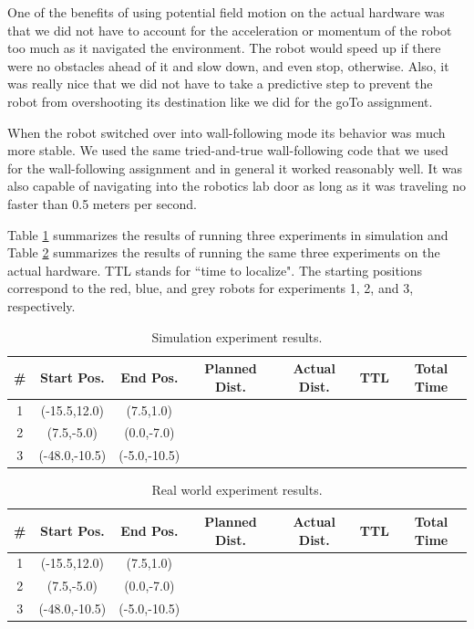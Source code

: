 \documentclass[12pt]{article}
\begin{document}
One of the benefits of using potential field motion on the actual hardware was that we did not have to account for the acceleration or momentum of the robot too much as it navigated the environment. The robot would speed up if there were no obstacles ahead of it and slow down, and even stop, otherwise. Also, it was really nice that we did not have to take a predictive step to prevent the robot from overshooting its destination like we did for the goTo assignment.

When the robot switched over into wall-following mode its behavior was much more stable. We used the same tried-and-true wall-following code that we used for the wall-following assignment and in general it worked reasonably well. It was also capable of navigating into the robotics lab door as long as it was traveling no faster than 0.5 meters per second.

Table \ref{tab:simresults} summarizes the results of running three experiments in simulation and Table \ref{tab:realresults} summarizes the results of running the same three experiments on the actual hardware. TTL stands for ``time to localize". The starting positions correspond to the red, blue, and grey robots for experiments 1, 2, and 3, respectively. \\

\begin{table}[h]
\centering
\begin{tabular}{| c | c | c | c | c | c | c |}
\hline
{\#} & Start Pos. & End Pos. & Planned Dist. & Actual Dist. & TTL & Total Time \\
\hline 
1 & (-15.5,12.0) & (7.5,1.0) & & & & \\
\hline 
2 & (7.5,-5.0) & (0.0,-7.0) & & & & \\
\hline 
3 & (-48.0,-10.5) & (-5.0,-10.5) & & & & \\
\hline
\end{tabular}
\caption{Simulation experiment results.}
\label{tab:simresults}
\end{table}

\newpage

\begin{table}[h]
\centering
\begin{tabular}{| c | c | c | c | c | c | c |}
\hline
{\#} & Start Pos. & End Pos. & Planned Dist. & Actual Dist. & TTL & Total Time \\ 
\hline 
1 & (-15.5,12.0) & (7.5,1.0) & & & & \\
\hline 
2 & (7.5,-5.0) & (0.0,-7.0) & & & & \\
\hline 
3 & (-48.0,-10.5) & (-5.0,-10.5) & & & & \\
\hline
\end{tabular}
\caption{Real world experiment results.}
\label{tab:realresults}
\end{table}
\end{document}
